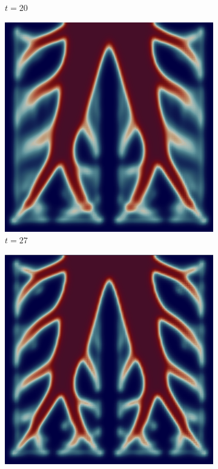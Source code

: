 \begin{figure}[H]
\begin{subfigure}{.4\textwidth}
        \caption{$t = 20$}
    \end{subfigure}
    \begin{subfigure}{.4\textwidth}
        \includegraphics[width=\textwidth]{imgs/UnitSquare_1/fifth.png}
        \caption{$t = 27$}
    \end{subfigure}
    \begin{subfigure}{.4\textwidth}
        \includegraphics[width=\textwidth]{imgs/UnitSquare_1/sixth.png}

\end{subfigure}
\end{figure}
